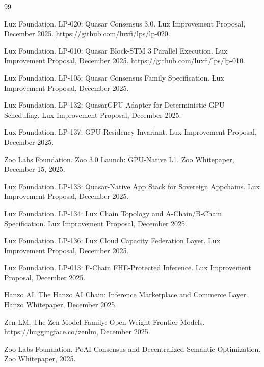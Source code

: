 \documentclass[11pt,letterpaper]{article}
\begin{document}
\begin{thebibliography}{99}

Lux Foundation.
\newblock LP-020: Quasar Consensus 3.0.
\newblock Lux Improvement Proposal, December 2025.
\newblock \url{https://github.com/luxfi/lps/lp-020}.

Lux Foundation.
\newblock LP-010: Quasar Block-STM 3 Parallel Execution.
\newblock Lux Improvement Proposal, December 2025.
\newblock \url{https://github.com/luxfi/lps/lp-010}.

Lux Foundation.
\newblock LP-105: Quasar Consensus Family Specification.
\newblock Lux Improvement Proposal, December 2025.

Lux Foundation.
\newblock LP-132: QuasarGPU Adapter for Deterministic GPU Scheduling.
\newblock Lux Improvement Proposal, December 2025.

Lux Foundation.
\newblock LP-137: GPU-Residency Invariant.
\newblock Lux Improvement Proposal, December 2025.

Zoo Labs Foundation.
\newblock Zoo 3.0 Launch: GPU-Native L1.
\newblock Zoo Whitepaper, December 15, 2025.

Lux Foundation.
\newblock LP-133: Quasar-Native App Stack for Sovereign Appchains.
\newblock Lux Improvement Proposal, December 2025.

Lux Foundation.
\newblock LP-134: Lux Chain Topology and A-Chain/B-Chain Specification.
\newblock Lux Improvement Proposal, December 2025.

Lux Foundation.
\newblock LP-136: Lux Cloud Capacity Federation Layer.
\newblock Lux Improvement Proposal, December 2025.

Lux Foundation.
\newblock LP-013: F-Chain FHE-Protected Inference.
\newblock Lux Improvement Proposal, December 2025.

Hanzo AI.
\newblock The Hanzo AI Chain: Inference Marketplace and Commerce Layer.
\newblock Hanzo Whitepaper, December 2025.

Zen LM.
\newblock The Zen Model Family: Open-Weight Frontier Models.
\newblock \url{https://huggingface.co/zenlm}, December 2025.

Zoo Labs Foundation.
\newblock PoAI Consensus and Decentralized Semantic Optimization.
\newblock Zoo Whitepaper, 2025.


\end{thebibliography}
\end{document}
